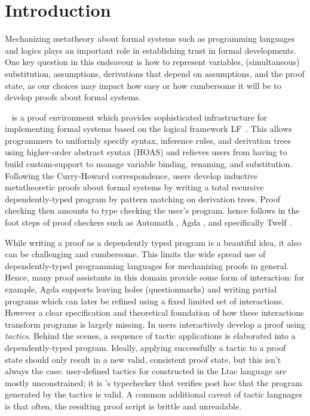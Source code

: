 \chapter{Introduction}
\label{chap:introduction}

Mechanizing metatheory about formal systems such as programming languages and
logics plays an important role in establishing trust in formal developments. One
key question in this endeavour is how to represent variables, (simultaneous)
substitution, assumptions, derivations that depend on assumptions, and the proof
state, as our choices may impact how easy or how cumbersome it will be to
develop proofs about formal systems.

\Beluga~\cite{Pientka:IJCAR10,Pientka:CADE15} is a proof environment which
provides sophisticated infrastructure for implementing formal systems based on
the logical framework LF~\cite{Harper93jacm}.
This allows programmers to uniformly specify syntax, inference rules, and
derivation trees using higher-order abstract syntax (HOAS) and relieves users
from having to build custom-support to manage variable binding,
renaming, and substitution.
%
Following the Curry-Howard correspondence, \Beluga{} users develop inductive
metatheoretic proofs about formal systems by writing a total recursive
dependently-typed program by pattern matching on derivation trees. Proof
checking then amounts to type checking the user's program.
\Beluga{} hence follows in the foot steps of proof checkers such as Automath
\cite{Nederpelt:94}, Agda \cite{Norell:phd07}, and specifically Twelf \cite{Pfenning99cade}.

%
While writing a proof as a dependently typed program is a beautiful idea, it also
can be challenging and cumbersome. This limits the wide spread use of
dependently-typed programming languages for mechanizing proofs in
general. Hence, many proof assistants in this domain provide some form
of interaction: for example, Agda \cite{Norell:phd07} supports leaving holes
(questionmarks) and writing partial programs which can later be
refined using a fixed limited set of interactions. However a clear
specification and theoretical foundation of how these interactions
transform programs is largely missing. In \Coq{}
\cite{bertot/casteran:2004} users interactively develop a proof using
\emph{tactics}. Behind the scenes, a sequence of tactic applications
is elaborated into a dependently-typed
program. Ideally, applying successfully a tactic to a proof state should
only result in a new valid, consistent proof state, but this isn't always the case:
user-defined tactics for \Coq{} constructed in the Ltac language
\cite{Delahaye:LPAR00} are mostly unconstrained; it is \Coq's typechecker
that verifies post hoc that the program generated by the tactics is
valid. A common additional caveat of tactic languages
is that often, the resulting proof script is brittle and
unreadable.


